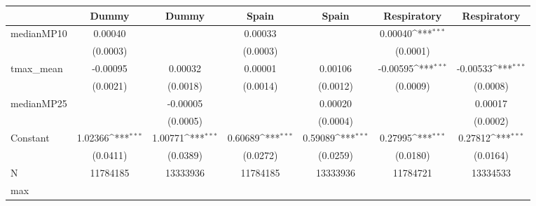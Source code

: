{
\def\sym#1{\ifmmode^{#1}\else\(^{#1}\)\fi}
\begin{tabular}{l*{6}{c}}
\toprule
            &\multicolumn{1}{c}{Dummy}&\multicolumn{1}{c}{Dummy}&\multicolumn{1}{c}{Spain}&\multicolumn{1}{c}{Spain}&\multicolumn{1}{c}{Respiratory}&\multicolumn{1}{c}{Respiratory}\\
\midrule
medianMP10  &     0.00040         &                     &     0.00033         &                     &     0.00040\sym{***}&                     \\
            &    (0.0003)         &                     &    (0.0003)         &                     &    (0.0001)         &                     \\
tmax\_mean   &    -0.00095         &     0.00032         &     0.00001         &     0.00106         &    -0.00595\sym{***}&    -0.00533\sym{***}\\
            &    (0.0021)         &    (0.0018)         &    (0.0014)         &    (0.0012)         &    (0.0009)         &    (0.0008)         \\
medianMP25  &                     &    -0.00005         &                     &     0.00020         &                     &     0.00017         \\
            &                     &    (0.0005)         &                     &    (0.0004)         &                     &    (0.0002)         \\
Constant    &     1.02366\sym{***}&     1.00771\sym{***}&     0.60689\sym{***}&     0.59089\sym{***}&     0.27995\sym{***}&     0.27812\sym{***}\\
            &    (0.0411)         &    (0.0389)         &    (0.0272)         &    (0.0259)         &    (0.0180)         &    (0.0164)         \\
\midrule
N           &    11784185         &    13333936         &    11784185         &    13333936         &    11784721         &    13334533         \\
max         &                     &                     &                     &                     &                     &                     \\
\bottomrule
\end{tabular}
}
